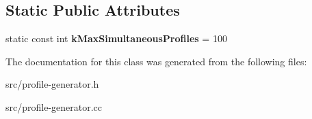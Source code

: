 \subsection*{Static Public Attributes}
\begin{DoxyCompactItemize}
\item 
\hypertarget{classv8_1_1internal_1_1_cpu_profiles_collection_a3c8efd32f53f7fa8fe100cc188d60be7}{}static const int {\bfseries k\+Max\+Simultaneous\+Profiles} = 100\label{classv8_1_1internal_1_1_cpu_profiles_collection_a3c8efd32f53f7fa8fe100cc188d60be7}

\end{DoxyCompactItemize}


The documentation for this class was generated from the following files\+:\begin{DoxyCompactItemize}
\item 
src/profile-\/generator.\+h\item 
src/profile-\/generator.\+cc\end{DoxyCompactItemize}
